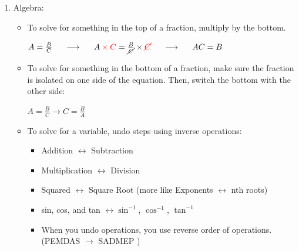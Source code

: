 \documentclass[letterpaper, 12pt]{article}
\begin{document}
\begin{enumerate}
	
	\item Algebra:
	\begin{itemize}
		\item To solve for something in the top of a fraction, multiply by the bottom.
		\begin{center}
			$A = \frac {B}{C} \hspace{0.2in} \longrightarrow \hspace{0.2in} A \color{red} \times C \color{black} = \frac {B}{\cancel{C}} \times \color{red} \cancel{C} \hspace{0.2in} \color{black} \longrightarrow  \hspace{0.2in} A C = B	$
		\end{center}
		\item To solve for something in the bottom of a fraction, make sure the fraction is isolated on one side of the equation.  Then, switch the bottom with the other side:
		\begin{center}
			$A = \frac {B}{C} \rightarrow C = \frac {B}{A}	$
		\end{center}
		\item To solve for a variable, undo steps using inverse operations:
			\begin{itemize}
				\item Addition  $ \leftrightarrow$ Subtraction 
				\item Multiplication $\leftrightarrow$ Division
				\item Squared $\leftrightarrow$ Square Root (more like  Exponents $\leftrightarrow$ nth roots)
				\item sin, cos, and tan $\leftrightarrow \sin^{-1}$, $\cos^{-1}$, $\tan^{-1}$
				\item When you undo operations, you use reverse order of operations. \\(PEMDAS $\rightarrow$ SADMEP )				
				

\end{itemize}
\end{itemize}
\end{enumerate}
\end{document}

